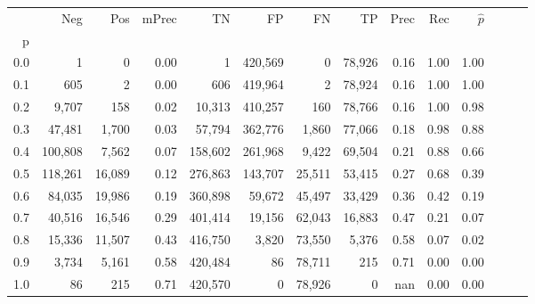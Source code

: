 \begin{tabular}{rrrrrrrrrrrrrr}
\toprule
{} &      Neg &     Pos & mPrec &       TN &       FP &      FN &      TP &  Prec &   Rec & $\hat{p}$ \\
p   &          &         &       &          &          &         &         &       &       &           \\
\midrule
0.0 &        1 &       0 &  0.00 &        1 &  420,569 &       0 &  78,926 &  0.16 &  1.00 &      1.00 \\
0.1 &      605 &       2 &  0.00 &      606 &  419,964 &       2 &  78,924 &  0.16 &  1.00 &      1.00 \\
0.2 &    9,707 &     158 &  0.02 &   10,313 &  410,257 &     160 &  78,766 &  0.16 &  1.00 &      0.98 \\
0.3 &   47,481 &   1,700 &  0.03 &   57,794 &  362,776 &   1,860 &  77,066 &  0.18 &  0.98 &      0.88 \\
0.4 &  100,808 &   7,562 &  0.07 &  158,602 &  261,968 &   9,422 &  69,504 &  0.21 &  0.88 &      0.66 \\
0.5 &  118,261 &  16,089 &  0.12 &  276,863 &  143,707 &  25,511 &  53,415 &  0.27 &  0.68 &      0.39 \\
0.6 &   84,035 &  19,986 &  0.19 &  360,898 &   59,672 &  45,497 &  33,429 &  0.36 &  0.42 &      0.19 \\
0.7 &   40,516 &  16,546 &  0.29 &  401,414 &   19,156 &  62,043 &  16,883 &  0.47 &  0.21 &      0.07 \\
0.8 &   15,336 &  11,507 &  0.43 &  416,750 &    3,820 &  73,550 &   5,376 &  0.58 &  0.07 &      0.02 \\
0.9 &    3,734 &   5,161 &  0.58 &  420,484 &       86 &  78,711 &     215 &  0.71 &  0.00 &      0.00 \\
1.0 &       86 &     215 &  0.71 &  420,570 &        0 &  78,926 &       0 &   nan &  0.00 &      0.00 \\
\bottomrule
\end{tabular}
